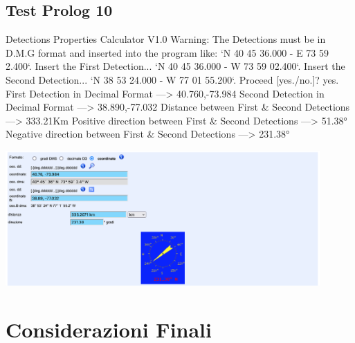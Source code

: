 \documentclass{article}
\begin{document}
\subsection*{Test Prolog 10}
	\begin{spverbatim}
		Detections Properties Calculator V1.0
		Warning: The Detections must be in D.M.G format and inserted into the program like: `N 40 45 36.000 - E 73 59 2.400`.
		Insert the First Detection...
		`N 40 45 36.000 - W 73 59 02.400`.
		Insert the Second Detection...
		`N 38 53 24.000 - W 77 01 55.200`.
		Proceed [yes./no.]?
		yes.
		First Detection in Decimal Format ---> 40.760,-73.984
		Second Detection in Decimal Format ---> 38.890,-77.032
		Distance between First & Second Detections ---> 333.21Km
		Positive direction between First & Second Detections ---> 51.38°
		Negative direction between First & Second Detections ---> 231.38°
	\end{spverbatim}
	\bigskip
	\includegraphics[width=0.9\textwidth]{Prolog_Tests/10-Calculation_of_Distant_Coordinates_Check}
\newpage

\section{Considerazioni Finali}
\raggedright
\end{document}

